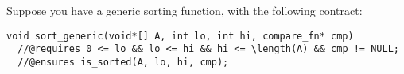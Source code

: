 \begin{parts}
\newpage
\begin{EnvUplevel}
  Suppose you have a generic sorting function, with the following contract:
\begin{lstlisting}[numbers=none]
void sort_generic(void*[] A, int lo, int hi, compare_fn* cmp)
  //@requires 0 <= lo && lo <= hi && hi <= \length(A) && cmp != NULL;
  //@ensures is_sorted(A, lo, hi, cmp);
\end{lstlisting}
\end{EnvUplevel}


\end{parts}